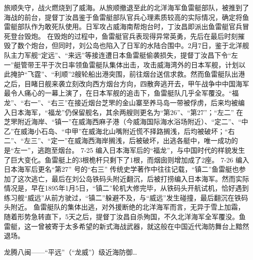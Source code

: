 \documentclass[12pt,UTF8]{ctexbook}
\begin{document}
旅顺失守，战火燃烧到了威海。从旅顺撤退至此的北洋海军鱼雷艇部队，被推到了海战的前台，提督丁汝昌鉴于鱼雷艇部队官兵心理素质较高的实际情况，确定将鱼雷艇部队作为敢死队使用。日军攻占威海南帮炮台时，丁汝昌即派出鱼雷艇官兵冒死登台毁炮。
在毁炮的过程中，鱼雷艇官兵表现得异常英勇，先后在最后时刻摧毁了数个炮台，但同时，刘公岛也陷入了日军的水陆合围中。2月7日，鉴于北洋舰队主力军舰“定远”、“来远”等接连遭日本鱼雷艇偷袭损失，提督丁汝昌下令“左一”艇管带王平于次日率领鱼雷艇队集体出击，攻击威海湾外的日本军舰，计划以此掩护“飞霆”、“利顺”2艘轮船出港突围，前往烟台送信求救。然而鱼雷艇队出港之后，目睹日舰来袭立刻改向西方烟台方向，四散奔逃开去，甲午战争中中国海军最令人痛心的一幕上演了，在日本军舰的追击下，鱼雷艇队几乎全军覆没。“福龙”、“右一”、“右三”在接近烟台芝罘的金山寨至养马岛一带被俘虏，后来均被编入日本海军，“福龙”仍保留舰名，其余两艘则更名为“第26”、“第27”；“左二” 在芝罘附近海岸、“镇一”在威海西麻子港（今威海国际海水浴场附近）、“定二”、“中乙”在威海小石岛、“中甲”在威海北山嘴附近慌不择路搁浅，后均被破坏；“右二”、“左三”、“定一”在威海西海岸搁浅，后被破坏，出逃各艇中，唯一成功的是“左一”，逃跑至烟台。
7-25
编入日本海军后的“福龙”，与中国时代的样貌发生了巨大变化。鱼雷艇上的3根桅杆只剩下了1根，而烟囱则增加成了2座。
7-26 编入日本海军后更名“第27” 号的“右三”
传统史学著作中往往记载，“镇二”鱼雷艇也参加了这次逃亡，最后在刘公岛铁码头附近翻沉，后被打捞编入日本海军。然而实际情况是，早在1895年1月5日，“镇二”轮机大修完毕，从铁码头开航试机，恰好遇到练习舰“威远”从前方驶过，“镇二”躲避不及，与“威远”发生碰撞，最后翻沉在铁码头附近。
鱼雷艇队的集体出逃，对外援断绝的北洋海军而言，无异于雪上加霜，随着形势急转直下，5天之后，提督丁汝昌自杀殉国，不久北洋海军全军覆没。鱼雷艇，这一曾被寄于太多希望的新式海战武器，就这般在中国近代海防舞台上黯然退场。




龙腾八闽——“平远”（“龙威”）级近海防御…
\end{document}
